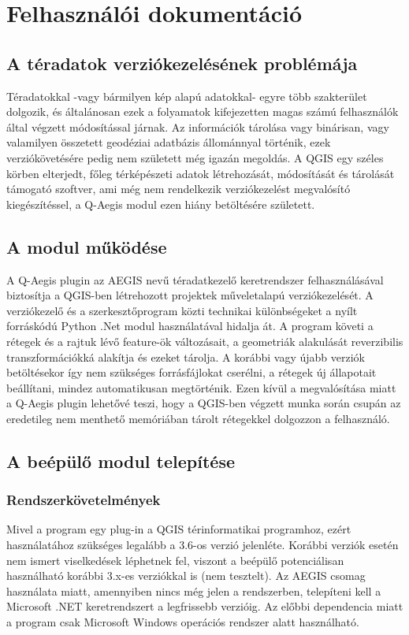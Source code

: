 \chapter{Felhasználói dokumentáció}
\label{ch:user}
\section{A téradatok verziókezelésének problémája}
Téradatokkal -vagy bármilyen kép alapú adatokkal- egyre több szakterület dolgozik, és általánosan ezek a folyamatok kifejezetten magas számú felhasználók által végzett módosítással járnak. Az információk tárolása vagy binárisan, vagy valamilyen összetett geodéziai adatbázis állománnyal történik, ezek verziókövetésére pedig nem született még igazán megoldás. A QGIS egy széles körben elterjedt, főleg térképészeti adatok létrehozását, módosítását és tárolását támogató szoftver, ami még nem rendelkezik verziókezelést megvalósító kiegészítéssel, a Q-Aegis modul ezen hiány betöltésére született.
\section{A modul működése}
A Q-Aegis plugin az AEGIS nevű téradatkezelő keretrendszer felhasználásával biztosítja a QGIS-ben létrehozott projektek műveletalapú verziókezelését. A verziókezelő és a szerkesztőprogram közti technikai különbségeket a nyílt forráskódú Python .Net modul használatával hidalja át. A program követi a rétegek és a rajtuk lévő feature-ök változásait, a geometriák alakulását reverzibilis transzformációkká alakítja és ezeket tárolja. A korábbi vagy újabb verziók betöltésekor így nem szükséges forrásfájlokat cserélni, a rétegek új állapotait beállítani, mindez automatikusan megtörténik. Ezen kívül a megvalósítása miatt a Q-Aegis plugin lehetővé teszi, hogy a QGIS-ben végzett munka során csupán az eredetileg nem menthető memóriában tárolt rétegekkel dolgozzon a felhasználó.

\section{A beépülő modul telepítése}
\subsection{Rendszerkövetelmények}
Mivel a program egy plug-in a QGIS térinformatikai programhoz, ezért használatához szükséges legalább a 3.6-os verzió jelenléte. Korábbi verziók esetén nem ismert viselkedések léphetnek fel, viszont a beépülő potenciálisan használható korábbi 3.x-es verziókkal is (nem tesztelt). Az AEGIS csomag használata miatt, amennyiben nincs még jelen a rendszerben, telepíteni kell a Microsoft .NET keretrendszert a legfrissebb verzióig. Az előbbi dependencia miatt a program csak Microsoft Windows operációs rendszer alatt használható.
